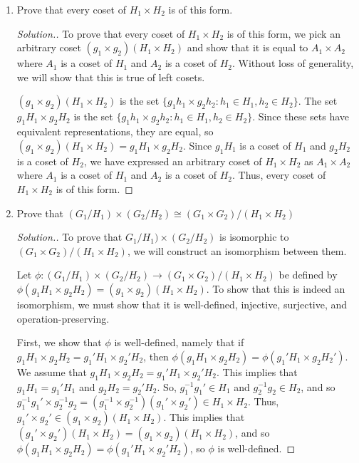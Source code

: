 \documentclass{article}
\newcommand{\sk}{\smallskip}
\begin{document}
\begin{enumerate}
\begin{enumerate}
\begin{proof}[Solution.]
            \sk

            Since both these sets are subsets of each other, we have that $(g_1 \times g_2)(H_1 \times H_2) = A_1 \times A_2$.
        \end{proof}
        
        \item Prove that every coset of $H_1 \times H_2$ is of this form. 
        \begin{proof}[Solution.]
            To prove that every coset of $H_1 \times H_2$ is of this form, we pick an arbitrary coset $(g_1 \times g_2)(H_1 \times H_2)$ and show that it is equal to $A_1 \times A_2$ where $A_1$ is a coset of $H_1$ and $A_2$ is a coset of $H_2$. Without loss of generality, we will show that this is true of left cosets. 

            \sk

            $(g_1 \times g_2)(H_1 \times H_2)$ is the set $\{g_1h_1 \times g_2h_2 : h_1 \in H_1, h_2 \in H_2\}$. The set $g_1H_1 \times g_2H_2$ is the set $\{g_1h_1 \times g_2h_2 : h_1 \in H_1, h_2 \in H_2\}$. Since these sets have equivalent representations, they are equal, so $(g_1 \times g_2)(H_1 \times H_2) = g_1H_1 \times g_2H_2$. Since $g_1H_1$ is a coset of $H_1$ and $g_2H_2$ is a coset of $H_2$, we have expressed an arbitrary coset of $H_1 \times H_2$ as $A_1 \times A_2$ where $A_1$ is a coset of $H_1$ and $A_2$ is a coset of $H_2$. Thus, every coset of $H_1 \times H_2$ is of this form.
        \end{proof}
        
        \item Prove that $(G_1 / H_1) \times (G_2 / H_2) \cong (G_1 \times G_2)/(H_1 \times H_2)$
        \begin{proof}[Solution.]
            To prove that $G_1 / H_1) \times (G_2 / H_2)$ is isomorphic to $(G_1 \times G_2)/(H_1 \times H_2)$, we will construct an isomorphism between them. 

            \sk

            Let $\phi: (G_1 / H_1) \times (G_2 / H_2) \rightarrow (G_1 \times G_2)/(H_1 \times H_2)$ be defined by $\phi(g_1H_1 \times g_2H_2) = (g_1 \times g_2)(H_1 \times H_2)$. To show that this is indeed an isomorphism, we must show that it is well-defined, injective, surjective, and operation-preserving. 

            \sk

            First, we show that $\phi$ is well-defined, namely that if $g_1H_1 \times g_2H_2 = g_1'H_1 \times g_2'H_2$, then $\phi(g_1H_1 \times g_2H_2) = \phi(g_1'H_1 \times g_2H_2')$. We assume that $g_1H_1 \times g_2H_2 = g_1'H_1 \times g_2'H_2$. This implies that $g_1H_1 = g_1'H_1$ and $g_2H_2 = g_2'H_2$. So, $g_1^{-1}g_1' \in H_1$ and $g_2^{-1}g_2 \in H_2$, and so $g_1^{-1}g_1' \times g_2^{-1}g_2 = (g_1^{-1} \times g_2^{-1})(g_1' \times g_2') \in H_1 \times H_2$. Thus, $g_1' \times g_2' \in (g_1 \times g_2)(H_1 \times H_2)$. This implies that $(g_1' \times g_2')(H_1 \times H_2) = (g_1 \times g_2)(H_1 \times H_2)$, and so $\phi(g_1H_1 \times g_2H_2) = \phi(g_1'H_1 \times g_2'H_2)$, so $\phi$ is well-defined.


\end{proof}
\end{enumerate}
\end{enumerate}
\end{document}
